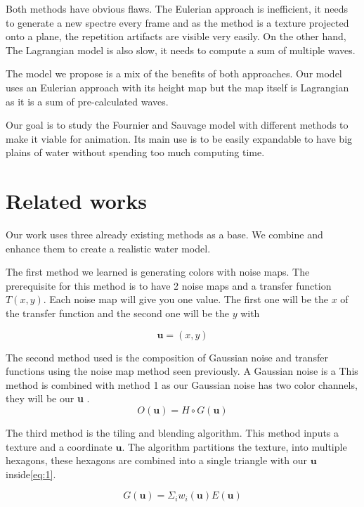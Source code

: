 \documentclass{article}
\begin{document}
Both methods have obvious flaws. The Eulerian approach is inefficient, it needs to generate a new spectre every frame and as the method is a texture projected onto a plane, the repetition artifacts are visible very easily. On the other hand, The Lagrangian model is also slow, it needs to compute a sum of multiple waves.

The model we propose is a mix of the benefits of both approaches. Our model uses an Eulerian approach with its height map but the map itself is Lagrangian as it is a sum of pre-calculated waves.

Our goal is to study the Fournier and Sauvage model\cite{fournier2025dynamic} with different methods to make it viable for animation. Its main use is to be easily expandable to have big plains of water without spending too much computing time.


\section{Related works}

Our work uses three already existing methods as a base. We combine and enhance them to create a realistic water model.

The first method we learned is generating colors with noise maps\cite{nvf}. The prerequisite for this method is to have 2 noise maps and a transfer function $T(x,y)$. Each noise map will give you one value. The first one will be the $x$ of the transfer function and the second one will be the $y$ with

\begin{equation}
\textbf{u} = (x,y)
\end{equation}


\label{m:1}The second method used is the composition of Gaussian noise and transfer functions using the noise map method seen previously. A Gaussian noise is a  This method is combined with method 1 as our
Gaussian noise has two color channels, they will be our \textbf{u} .
\begin{equation} \label{eq:2}
    O(\textbf{u}) = H \circ G(\textbf{u})
\end{equation}

The third method is the tiling and blending algorithm\cite{hn}. This method inputs a texture and a coordinate $\textbf{u}$. The algorithm partitions the texture, into multiple hexagons, these hexagons are combined into a single triangle with our $\textbf{u}$ inside\ref{eq:1}.

\begin{equation} \label{eq:1}
    G(\textbf{u}) = \Sigma_i{w_i(\textbf{u})E(\textbf{u})}
\end{equation}
\end{document}
